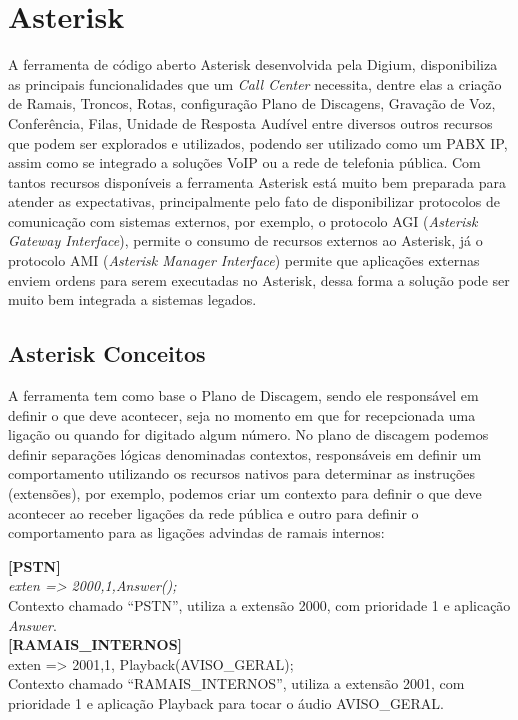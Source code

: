 \section{Asterisk}
A ferramenta de código aberto Asterisk desenvolvida pela Digium, disponibiliza as principais funcionalidades que um \textit{Call Center} necessita, dentre elas a criação de Ramais, Troncos, Rotas, configuração Plano de Discagens, Gravação de Voz, Conferência, Filas, Unidade de Resposta Audível entre diversos outros recursos que podem ser explorados e utilizados, podendo ser utilizado como um PABX IP, assim como se integrado a soluções VoIP ou a rede de telefonia pública.
Com tantos recursos disponíveis a ferramenta Asterisk está muito bem preparada para atender as expectativas, principalmente pelo fato de disponibilizar protocolos de comunicação com sistemas externos, por exemplo, o protocolo AGI (\textit{Asterisk Gateway Interface}), permite o consumo de recursos externos ao Asterisk, já o protocolo AMI (\textit{Asterisk Manager Interface}) permite que aplicações externas enviem ordens para serem executadas no Asterisk, dessa forma a solução pode ser muito bem integrada a sistemas legados.


\subsection{Asterisk Conceitos}

A ferramenta tem como base o Plano de Discagem, sendo ele responsável em definir o que deve acontecer, seja no momento em que for recepcionada uma ligação ou quando for digitado algum número. No plano de discagem podemos definir separações lógicas denominadas contextos, responsáveis em definir um comportamento utilizando os recursos nativos para determinar as instruções (extensões), por exemplo, podemos criar um contexto para definir o que deve acontecer ao receber ligações da rede pública e outro para definir o comportamento para as ligações advindas de ramais internos:

\begin{flushleft}

\textbf{[PSTN]} \\
\textit{exten => 2000,1,Answer();} \\
Contexto chamado “PSTN”, utiliza a extensão 2000, com prioridade 1 e aplicação \textit{Answer}.\\

\textbf{[RAMAIS\_INTERNOS]} \\
exten => 2001,1, Playback(AVISO\_GERAL); \\
Contexto chamado “RAMAIS\_INTERNOS”, utiliza a extensão 2001, com prioridade 1 e aplicação Playback para tocar o áudio AVISO\_GERAL.\\
\end{flushleft}

